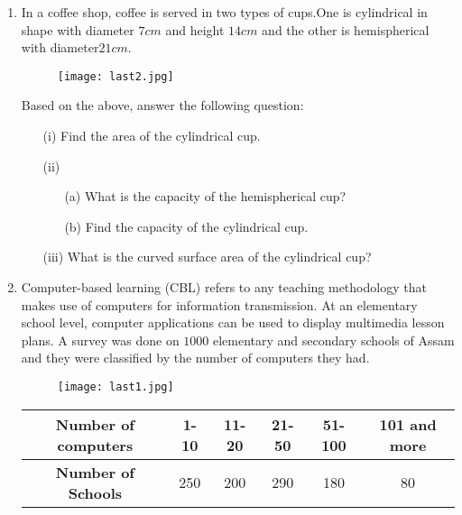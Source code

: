 \documentclass{article}
\begin{document}
\begin{enumerate}
\item In a coffee shop, coffee is served in two types of cups.One is cylindrical  in shape with diameter $7 cm$ and height $14 cm $ and the other is hemispherical with diameter$21 cm$.

	
	\begin{figure}[!ht]
		\centering
		\texttt{[image: last2.jpg]}
		\caption{}
		\label{fig:enter-label}
	\end{figure}

	\text Based on the above, answer the following question:
	\begin{enumerate}
		\item[(i) ] Find the area of the cylindrical cup.
		\item[(ii) ]
		\begin{enumerate}
			\item[(a)] What is the capacity of the hemispherical cup?
			\item[(b)] Find the capacity of the cylindrical cup.
		\end{enumerate}
		\item[(iii)] What is the curved surface area of the cylindrical cup?
	\end{enumerate}

\item Computer-based learning (CBL) refers to any teaching methodology that makes use of computers for information transmission. At an elementary school level, computer applications can be used to display multimedia lesson plans. A survey was done on $1000$ elementary and secondary schools of Assam and they were classified by the number of computers they had.

	\begin{figure}[!ht]
		\centering
		\texttt{[image: last1.jpg]}
		\caption{}
		\label{fig:enter-label}
	\end{figure}

	\begin{center}
	\begin{tabular}{|c|c|c|c|c|c|}
	\hline
	\textbf{Number of computers} & 1-10 & 11-20 & 21-50 &  51-100 & 101 and more \\
	\hline
	\textbf{Number of Schools} & 250 & 200 & 290 & 180 & 80 \\
	\hline
	\end{tabular}
	\end{center}




\end{enumerate}
\end{document}
